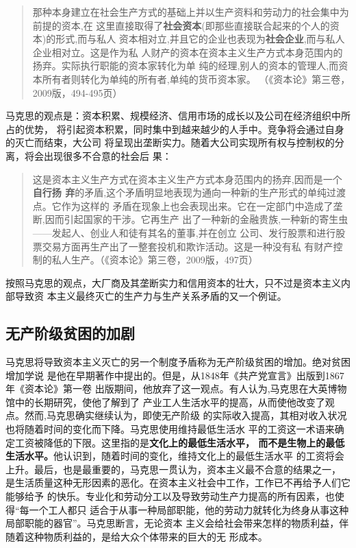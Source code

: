 \begin{quotation}
  那种本身建立在社会生产方式的基础上并以生产资料和劳动力的社会集中为前提的资本,在
  这里直接取得了\textbf{社会资本}(即那些直接联合起来的个人的资本)的形式,而与私人
  资本相对立,并且它的企业也表现为\textbf{社会企业},而与私人企业相对立。这是作为私
  人财产的资本在资本主义生产方式本身范围内的扬弃。实际执行职能的资本家转化为单
  纯的经理,别人的资本的管理人,而资本所有者则转化为单纯的所有者,单纯的货币资本家。
  （《资本论》第三卷，2009版，494-495页）
\end{quotation}

马克思的观点是：资本积累、规模经济、信用市场的成长以及公司在经济组织中所占的优势，
将引起资本积累，同时集中到越来越少的人手中。竞争将会通过自身的灭亡而结束，大公司
将呈现出垄断实力。随着大公司实现所有权与控制权的分离，将会出现很多不合意的社会后
果：

\begin{quotation}
  这是资本主义生产方式在资本主义生产方式本身范围内的扬弃,因而是一个\textbf{自行扬
    弃}的矛盾,这个矛盾明显地表现为通向一种新的生产形式的单纯过渡点。它作为这样的
  矛盾在现象上也会表现出来。它在一定部门中造成了垄断,因而引起国家的干涉。它再生产
  出了一种新的金融贵族,一种新的寄生虫——发起人、创业人和徒有其名的董事,并在创立
  公司、发行股票和进行股票交易方面再生产出了一整套投机和欺诈活动。这是一种没有私
  有财产控制的私人生产。（《资本论》第三卷，2009版，497页）
\end{quotation}

按照马克思的观点，大厂商及其垄断实力和信用资本的壮大，只不过是资本主义内部导致资
本主义最终灭亡的生产力与生产关系矛盾的又一个例证。

\subsection{无产阶级贫困的加剧}

马克思将导致资本主义灭亡的另一个制度予盾称为无产阶级贫困的增加。绝对贫困增加学说
是他在早期著作中提出的。但是，从1848年《共产党宣言》出版到1867年《资本论》第一卷
出版期间，他放弃了这一观点。有人认为,马克思在大英博物馆中的长期研究，使他了解到了
产业工人生活水平的提高，从而使他改变了观点。然而,马克思确实继续认为，即使无产阶级
的实际收入提高，其相对收入状况也将随着时间的变化而下降。马克思使用维持最低生活水
平的工资这一术语来确定工资被降低的下限。这里指的是\textbf{文化上的最低生活水平，
  而不是生物上的最低生活水平。}他认识到，随着时间的变化，维持文化上的最低生活水平
的工资将会上升。最后，也是最重要的，马克思一贯认为，资本主义最不合意的结果之一，
是生活质量这种无形因素的恶化。在资本主义社会中工作，工作已不再给予人们它能够给予
的快乐。专业化和劳动分工以及导致劳动生产力提高的所有因素，也使得“每一个工人都只
适合于从事一种局部职能，他的劳动力就转化为终身从事这种局部职能的器官”。马克思断言，无论资本
主义会给社会带来怎样的物质利益，伴随着这种物质利益的，是给大众个体带来的巨大的无
形成本。

